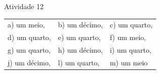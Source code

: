 \begin{resposta*}{Atividade 12}

\begin{tabular}{lll}
a) um meio,&  b) um décimo,& c) um quarto,\\
d) um quarto,& e) um quarto,& f) um meio,\\
g) um quarto,& h) um décimo,& i) um quarto,\\
j) um décimo,& l) um quarto,& m) um meio
\end{tabular}
\end{resposta*}
